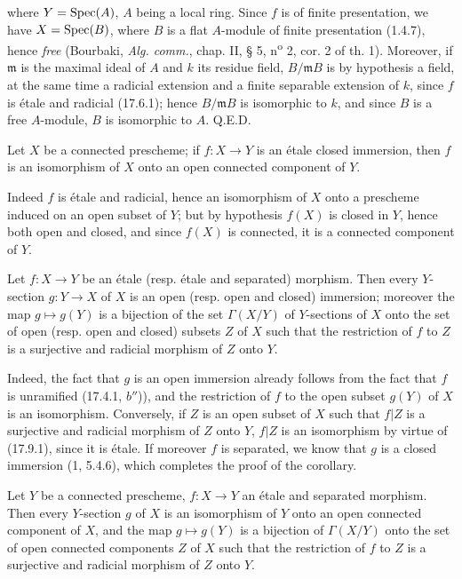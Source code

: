 
where $Y=\operatorname{Spec}(A)$, $A$ being a local ring. Since $f$ is of finite presentation, we have $X=\operatorname{Spec}(B)$, where $B$ is a flat $A$-module of finite presentation (1.4.7), hence \emph{free} (Bourbaki, \emph{Alg. comm.}, chap. II, § 5, n\textsuperscript{o} 2, cor. 2 of th. 1). Moreover, if $\mathfrak m$ is the maximal ideal of $A$ and $k$ its residue field, $B/\mathfrak mB$ is by hypothesis a field, at the same time a radicial extension and a finite separable extension of $k$, since $f$ is étale and radicial (17.6.1); hence $B/\mathfrak mB$ is isomorphic to $k$, and since $B$ is a free $A$-module, $B$ is isomorphic to $A$. Q.E.D.

\begin{corollary}[17.9.2]
\label{IV.17.9.2}
Let $X$ be a connected prescheme; if $f:X\to Y$ is an étale closed immersion, then $f$ is an isomorphism of $X$ onto an open connected component of $Y$.
\end{corollary}

Indeed $f$ is étale and radicial, hence an isomorphism of $X$ onto a prescheme induced on an open subset of $Y$; but by hypothesis $f(X)$ is closed in $Y$, hence both open and closed, and since $f(X)$ is connected, it is a connected component of $Y$.

\begin{corollary}[17.9.3]
\label{IV.17.9.3}
Let $f:X\to Y$ be an étale (resp. étale and separated) morphism. Then every $Y$-section $g:Y\to X$ of $X$ is an open (resp. open and closed) immersion; moreover the map $g\mapsto g(Y)$ is a bijection of the set $\Gamma(X/Y)$ of $Y$-sections of $X$ onto the set of open (resp. open and closed) subsets $Z$ of $X$ such that the restriction of $f$ to $Z$ is a surjective and radicial morphism of $Z$ onto $Y$.
\end{corollary}

Indeed, the fact that $g$ is an open immersion already follows from the fact that $f$ is unramified (17.4.1, $b''$)), and the restriction of $f$ to the open subset $g(Y)$ of $X$ is an isomorphism. Conversely, if $Z$ is an open subset of $X$ such that $f|Z$ is a surjective and radicial morphism of $Z$ onto $Y$, $f|Z$ is an isomorphism by virtue of (17.9.1), since it is étale. If moreover $f$ is separated, we know that $g$ is a closed immersion (1, 5.4.6), which completes the proof of the corollary.

\begin{corollary}[17.9.4]
\label{IV.17.9.4}
Let $Y$ be a connected prescheme, $f:X\to Y$ an étale and separated morphism. Then every $Y$-section $g$ of $X$ is an isomorphism of $Y$ onto an open connected component of $X$, and the map $g\mapsto g(Y)$ is a bijection of $\Gamma(X/Y)$ onto the set of open connected components $Z$ of $X$ such that the restriction of $f$ to $Z$ is a surjective and radicial morphism of $Z$ onto $Y$.
\end{corollary}

